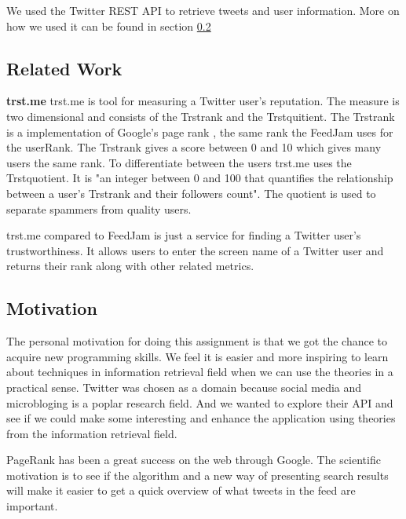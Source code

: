 We used the Twitter REST API to retrieve tweets and user information. More on how we used it can be found in section \ref{} \nameref{} 




\subsection{Related Work}
{\bf trst.me} \newline
trst.me \citet{Infochimps2012b} is tool for measuring a Twitter user's reputation. The measure is two dimensional and consists of the Trstrank and the Trstquitient. The Trstrank is a implementation of Google's page rank \citep{Infochimps2012a}, the same rank the FeedJam uses for the userRank. The Trstrank gives a score between 0 and 10 which gives many users the same rank. To differentiate between the users trst.me uses the Trstquotient. It is "an integer between 0 and 100 that quantifies the relationship between a user's Trstrank and their followers count"\citep{Infochimps2012}. The quotient is used to separate spammers from quality users. 

trst.me compared to FeedJam is just a service for finding a Twitter user's trustworthiness. It allows users to enter the screen name of a Twitter user and returns their rank along with other related metrics.  

\subsection{Motivation} %
The personal motivation for doing this assignment is that we got the chance to acquire new programming skills. We feel it is easier and more inspiring to learn about techniques in information retrieval field when we can use the theories in a practical sense. Twitter was chosen as a domain because social media and microbloging is a poplar research field. And we wanted to explore their API and see if we could make some interesting and enhance the application using theories from the information retrieval field. 

PageRank has been a great success on the web through Google. The scientific motivation is to see if the algorithm and a new way of presenting search results will make it easier to get a quick overview of what tweets in the feed are important.


